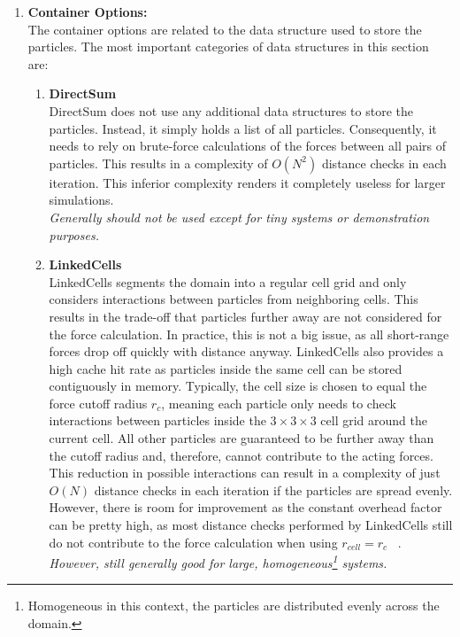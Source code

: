 \begin{enumerate}[label=\textbf{\arabic*.}]
      \item \textbf{Container Options:} \\
            The container options are related to the data structure used to store the particles. The most important categories of data structures in this section are:
            \begin{enumerate}
                  \item \textbf{DirectSum} \\
                        DirectSum does not use any additional data structures to store the particles. Instead, it simply holds a list of all particles. Consequently, it needs to rely on brute-force calculations of the forces between all pairs of particles. This results in a complexity of $O(N^2)$ distance checks in each iteration. This inferior complexity renders it completely useless for larger simulations.\\
                        \textit{Generally should not be used except for tiny systems or demonstration purposes.~\cite{VICCIONE2008625}}
                  \item \textbf{LinkedCells} \\
                        LinkedCells segments the domain into a regular cell grid and only considers interactions between particles from neighboring cells. This results in the trade-off that particles further away are not considered for the force calculation. In practice, this is not a big issue, as all short-range forces drop off quickly with distance anyway.
                        LinkedCells also provides a high cache hit rate as particles inside the same cell can be stored contiguously in memory. Typically, the cell size is chosen to equal the force cutoff radius $r_c$, meaning each particle only needs to check interactions between particles inside the $3\times3\times3$ cell grid around the current cell. All other particles are guaranteed to be further away than the cutoff radius and, therefore, cannot contribute to the acting forces.
                        This reduction in possible interactions can result in a complexity of just $O(N)$ distance checks in each iteration if the particles are spread evenly. However, there is room for improvement as the constant overhead factor can be pretty high, as most distance checks performed by LinkedCells still do not contribute to the force calculation when using $r_{cell}=r_c$ ~\cite{GRATL2019748}.\\
                        \textit{However, still generally good for large, homogeneous\footnote{Homogeneous in this context, the particles are distributed evenly across the domain.} systems.}


\end{enumerate}
\end{enumerate}

